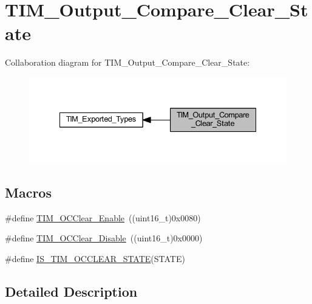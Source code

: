 \hypertarget{group___t_i_m___output___compare___clear___state}{}\section{T\+I\+M\+\_\+\+Output\+\_\+\+Compare\+\_\+\+Clear\+\_\+\+State}
\label{group___t_i_m___output___compare___clear___state}
Collaboration diagram for T\+I\+M\+\_\+\+Output\+\_\+\+Compare\+\_\+\+Clear\+\_\+\+State\+:
\nopagebreak
\begin{figure}[H]
\begin{center}
\leavevmode
\includegraphics[width=335pt]{group___t_i_m___output___compare___clear___state}
\end{center}
\end{figure}
\subsection*{Macros}
\begin{DoxyCompactItemize}
\item 
\#define \hyperlink{group___t_i_m___output___compare___clear___state_ga1b7bce48b3e1478aad98c95fbbe7a6e0}{T\+I\+M\+\_\+\+O\+C\+Clear\+\_\+\+Enable}~((uint16\+\_\+t)0x0080)
\item 
\#define \hyperlink{group___t_i_m___output___compare___clear___state_gadb09946cb5dded7520baf4b19173204d}{T\+I\+M\+\_\+\+O\+C\+Clear\+\_\+\+Disable}~((uint16\+\_\+t)0x0000)
\item 
\#define \hyperlink{group___t_i_m___output___compare___clear___state_ga5297586b42da9263ac4f767c83202fed}{I\+S\+\_\+\+T\+I\+M\+\_\+\+O\+C\+C\+L\+E\+A\+R\+\_\+\+S\+T\+A\+TE}(S\+T\+A\+TE)
\end{DoxyCompactItemize}


\subsection{Detailed Description}


